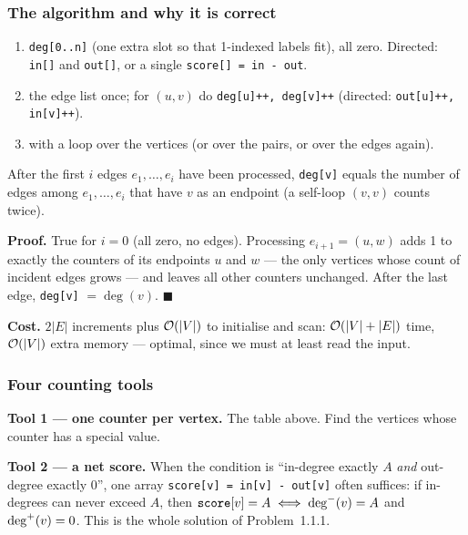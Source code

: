 \subsubsection*{The algorithm and why it is correct}

\begin{enumerate}[leftmargin=*]
    \item {} \texttt{deg[0..n]} (one extra slot so that 1-indexed labels fit), all zero. Directed: \texttt{in[]} and \texttt{out[]}, or a single \texttt{score[] = in - out}.
    \item {} the edge list once; for $(u,v)$ do \texttt{deg[u]++, deg[v]++} (directed: \texttt{out[u]++, in[v]++}).
    \item {} with a loop over the vertices (or over the pairs, or over the edges again).
\end{enumerate}

\begin{invariantbox}
After the first $i$ edges $e_1,\dots,e_i$ have been processed, \texttt{deg[v]} equals the number of edges among $e_1,\dots,e_i$ that have $v$ as an endpoint (a self-loop $(v,v)$ counts twice).

\textbf{Proof.} True for $i = 0$ (all zero, no edges). Processing $e_{i+1} = (u,w)$ adds 1 to exactly the counters of its endpoints $u$ and $w$ --- the only vertices whose count of incident edges grows --- and leaves all other counters unchanged. After the last edge, \texttt{deg[v]} $=\deg(v)$. \hfill$\blacksquare$

\textbf{Cost.} $2|E|$ increments plus $\mathcal{O}(|V|)$ to initialise and scan: $\mathcal{O}(|V|+|E|)$ time, $\mathcal{O}(|V|)$ extra memory --- optimal, since we must at least read the input.
\end{invariantbox}

\subsubsection*{Four counting tools}

\textbf{Tool 1 --- one counter per vertex.} The table above. Find the vertices whose counter has a special value.

\textbf{Tool 2 --- a net score.} When the condition is ``in-degree exactly $A$ \emph{and} out-degree exactly $0$'', one array \texttt{score[v] = in[v] - out[v]} often suffices: if in-degrees can never exceed $A$, then $\texttt{score}[v] = A \iff \deg^{-}(v) = A$ and $\deg^{+}(v) = 0$. This is the whole solution of Problem~1.1.1.

